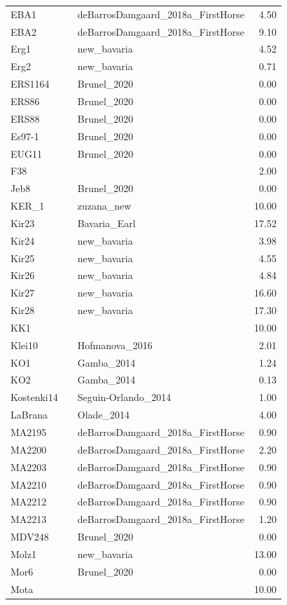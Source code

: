 \begin{longtable}[t]{lllr}
EBA1 &  & deBarrosDamgaard\_2018a\_FirstHorse & 4.50\\
EBA2 &  & deBarrosDamgaard\_2018a\_FirstHorse & 9.10\\
Erg1 &  & new\_bavaria & 4.52\\
Erg2 &  & new\_bavaria & 0.71\\
ERS1164 &  & Brunel\_2020 & 0.00\\
ERS86 &  & Brunel\_2020 & 0.00\\
ERS88 &  & Brunel\_2020 & 0.00\\
Es97-1 &  & Brunel\_2020 & 0.00\\
EUG11 &  & Brunel\_2020 & 0.00\\
F38 &  &  & 2.00\\
Jeb8 &  & Brunel\_2020 & 0.00\\
KER\_1 &  & zuzana\_new & 10.00\\
Kir23 &  & Bavaria\_Earl & 17.52\\
Kir24 &  & new\_bavaria & 3.98\\
Kir25 &  & new\_bavaria & 4.55\\
Kir26 &  & new\_bavaria & 4.84\\
Kir27 &  & new\_bavaria & 16.60\\
Kir28 &  & new\_bavaria & 17.30\\
KK1 &  &  & 10.00\\
Klei10 &  & Hofmanova\_2016 & 2.01\\
KO1 &  & Gamba\_2014 & 1.24\\
KO2 &  & Gamba\_2014 & 0.13\\
Kostenki14 &  & Seguin-Orlando\_2014 & 1.00\\
LaBrana &  & Olade\_2014 & 4.00\\
MA2195 &  & deBarrosDamgaard\_2018a\_FirstHorse & 0.90\\
MA2200 &  & deBarrosDamgaard\_2018a\_FirstHorse & 2.20\\
MA2203 &  & deBarrosDamgaard\_2018a\_FirstHorse & 0.90\\
MA2210 &  & deBarrosDamgaard\_2018a\_FirstHorse & 0.90\\
MA2212 &  & deBarrosDamgaard\_2018a\_FirstHorse & 0.90\\
MA2213 &  & deBarrosDamgaard\_2018a\_FirstHorse & 1.20\\
MDV248 &  & Brunel\_2020 & 0.00\\
Molz1 &  & new\_bavaria & 13.00\\
Mor6 &  & Brunel\_2020 & 0.00\\
Mota &  &  & 10.00\\

\end{longtable}
